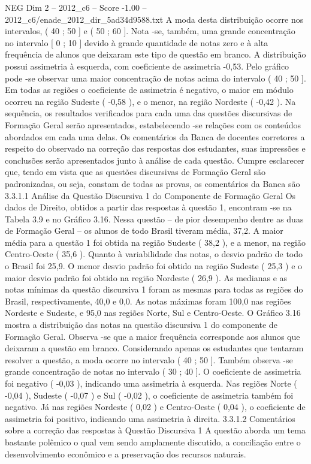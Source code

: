 \begin{textsample}{NEG Dim 2 – 2012\_c6 – Score -1.00 – 2012\_c6/enade\_2012\_dir\_5ad34d9588.txt}
A moda desta distribuição ocorre nos intervalos, ( 40 ; 50 ] e ( 50 ; 60 ].
Nota -se, também, uma grande concentração no intervalo [ 0 ; 10 ] devido à grande quantidade de notas zero e à alta frequência de alunos que deixaram este tipo de questão em branco.
A distribuição possui assimetria à esquerda, com coeficiente de assimetria -0,53.
Pelo gráfico pode -se observar uma maior concentração de notas acima do intervalo ( 40 ; 50 ].
Em todas as regiões o coeficiente de assimetria é negativo, o maior em módulo ocorreu na região Sudeste ( -0,58 ), e o menor, na região Nordeste ( -0,42 ).
Na sequência, os resultados verificados para cada uma das questões discursivas de Formação Geral serão apresentados, estabelecendo -se relações com os conteúdos abordados em cada uma delas.
Os comentários da Banca de docentes corretores a respeito do observado na correção das respostas dos estudantes, suas impressões e conclusões serão apresentados junto à análise de cada questão.
Cumpre esclarecer que, tendo em vista que as questões discursivas de Formação Geral são padronizadas, ou seja, constam de todas as provas, os comentários da Banca são 3.3.1.1 Análise da Questão Discursiva 1 do Componente de Formação Geral Os dados de Direito, obtidos a partir das respostas à questão 1, encontram -se na Tabela 3.9 e no Gráfico 3.16.
Nessa questão – de pior desempenho dentre as duas de Formação Geral – os alunos de todo Brasil tiveram média, 37,2.
A maior média para a questão 1 foi obtida na região Sudeste ( 38,2 ), e a menor, na região Centro-Oeste ( 35,6 ).
Quanto à variabilidade das notas, o desvio padrão de todo o Brasil foi 25,9.
O menor desvio padrão foi obtido na região Sudeste ( 25,3 ) e o maior desvio padrão foi obtido na região Nordeste ( 26,9 ).
As medianas e as notas mínimas da questão discursiva 1 foram as mesmas para todas as regiões do Brasil, respectivamente, 40,0 e 0,0.
As notas máximas foram 100,0 nas regiões Nordeste e Sudeste, e 95,0 nas regiões Norte, Sul e Centro-Oeste.
O Gráfico 3.16 mostra a distribuição das notas na questão discursiva 1 do componente de Formação Geral.
Observa -se que a maior frequência corresponde aos alunos que deixaram a questão em branco.
Considerando apenas os estudantes que tentaram resolver a questão, a moda ocorre no intervalo ( 40 ; 50 ].
Também observa -se grande concentração de notas no intervalo ( 30 ; 40 ].
O coeficiente de assimetria foi negativo ( -0,03 ), indicando uma assimetria à esquerda.
Nas regiões Norte ( -0,04 ), Sudeste ( -0,07 ) e Sul ( -0,02 ), o coeficiente de assimetria também foi negativo.
Já nas regiões Nordeste ( 0,02 ) e Centro-Oeste ( 0,04 ), o coeficiente de assimetria foi positivo, indicando uma assimetria à direita. 3.3.1.2 Comentários sobre a correção das respostas à Questão Discursiva 1 A questão aborda um tema bastante polêmico o qual vem sendo amplamente discutido, a conciliação entre o desenvolvimento econômico e a preservação dos recursos naturais.

\end{textsample}
